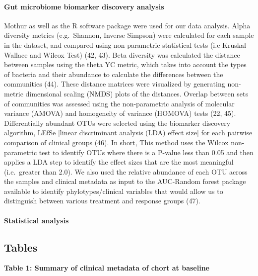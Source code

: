 \documentclass[11pt,]{article}
\let\oldparagraph\paragraph
\renewcommand{\paragraph}[1]{\oldparagraph{#1}\mbox{}}
\begin{document}
\paragraph{Gut microbiome biomarker discovery
analysis}\label{gut-microbiome-biomarker-discovery-analysis}

Mothur as well as the R software package were used for our data
analysis. Alpha diversity metrics (e.g.~Shannon, Inverse Simpson) were
calculated for each sample in the dataset, and compared using
non-parametric statistical tests (i.e Kruskal-Wallace and Wilcox Test)
(42, 43). Beta diversity was calculated the distance between samples
using the theta YC metric, which takes into account the types of
bacteria and their abundance to calculate the differences between the
communities (44). These distance matrices were visualized by generating
non-metric dimensional scaling (NMDS) plots of the distances. Overlap
between sets of communities was assessed using the non-parametric
analysis of molecular variance (AMOVA) and homogeneity of variance
(HOMOVA) tests (22, 45). Differentially abundant OTUs were selected
using the biomarker discovery algorithm, LEfSe {[}linear discriminant
analysis (LDA) effect size{]} for each pairwise comparison of clinical
groups (46). In short, This method uses the Wilcox non-parametric test
to identify OTUs where there is a P-value less than 0.05 and then
applies a LDA step to identify the effect sizes that are the most
meaningful (i.e.~greater than 2.0). We also used the relative abundance
of each OTU across the samples and clinical metadata as input to the
AUC-Random forest package available to identify phylotypes/clinical
variables that would allow us to distinguish between various treatment
and response groups (47).

\paragraph{Statistical analysis}\label{statistical-analysis}

\newpage

\subsection{Tables}\label{tables}

\textbf{Table 1: Summary of clinical metadata of chort at baseline}
\end{document}
